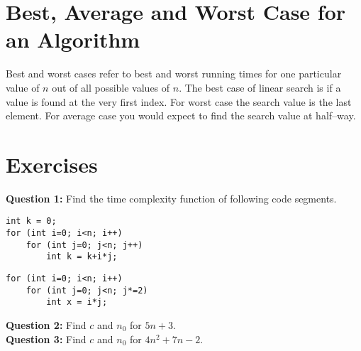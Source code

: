 \documentclass[12pt,a4paper]{article}
\begin{document}
\section{Best, Average and Worst Case for an Algorithm}
Best and worst cases refer to best and worst running times for one particular value of $n$ out of all possible values of $n$. The best case of linear search is if a value is found at the very first index. For worst case the search value is the last element. For average case you would expect to find the search value at half--way.
\section{Exercises}
\noindent\textbf{Question 1:} Find the time complexity function of following code segments.
\begin{lstlisting}
int k = 0;
for (int i=0; i<n; i++)
    for (int j=0; j<n; j++)
        int k = k+i*j;
\end{lstlisting}
\begin{lstlisting}
for (int i=0; i<n; i++)
    for (int j=0; j<n; j*=2)
        int x = i*j;
\end{lstlisting}
\noindent\textbf{Question 2:} Find $c$ and $n_0$ for $5n+3$.\\[0.2cm]
\noindent\textbf{Question 3:} Find $c$ and $n_0$ for $4n^2+7n-2$.


\end{document}
